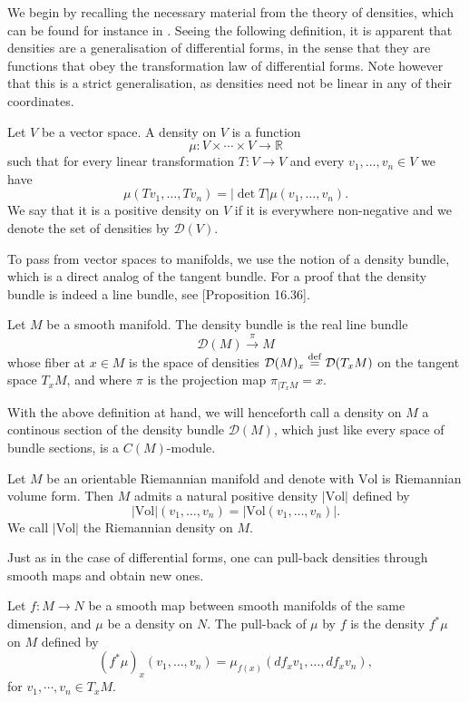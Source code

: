 \documentclass{report}
\begin{document}
We begin by recalling the necessary material from the theory of densities, which can be found for instance in \cite{lee2012smooth}. 
Seeing the following definition, it is apparent that densities are a generalisation of differential forms, in the sense that they are functions that obey the transformation law of differential forms.
Note however that this is a strict generalisation, as densities need not be linear in any of their coordinates. 
\begin{definition}
    Let $V$ be a vector space.
    A density on $V$ is a function
    \[
    \mu: V\times \cdots \times V \to \mathbb R
    \]
    such that for every linear transformation $T: V \to V$ and every $v_1, \ldots, v_n \in V$ we have
    \[ 
    \mu(Tv_1, \ldots, Tv_n) = |\det T| \mu(v_1, \ldots, v_n).
    \]
    We say that it is a positive density on $V$ if it is everywhere non-negative and we denote the set of densities by $\mathcal D(V)$.
\end{definition}
To pass from vector spaces to manifolds, we use the notion of a density bundle, which is a direct analog of the tangent bundle.
For a proof that the density bundle is indeed a line bundle, see \cite{lee2012smooth}[Proposition 16.36].
\begin{definition}
    Let $M$ be a smooth manifold.
    The density bundle is the real line bundle $$\mathcal D(M) \overset{\pi}{\to} M$$ whose fiber at $x \in M$ is the space of densities $\mathcal D(M)_x \overset{\mathrm{def}}{=} \mathcal D(T_x M)$ on the tangent space $T_x M$, and where $\pi$ is the projection map $\pi_{|T_x M} = x$.
\end{definition}
With the above definition at hand, we will henceforth call a density on $M$ a continous section of the density bundle $\mathcal D(M)$, which 
just like every space of bundle sections, is a $C(M)$-module.
\begin{example}
    Let $M$ be an orientable Riemannian manifold and denote with $\mathrm{Vol}$ is Riemannian volume form.
    Then $M$ admits a natural positive density $|\mathrm{Vol}|$ defined by
    \[
    |\mathrm{Vol}|(v_1, \ldots, v_n) = |\mathrm{Vol}(v_1, \ldots, v_n)|.
    \]
    We call $|\mathrm{Vol}|$ the Riemannian density on $M$.
\end{example}

Just as in the case of differential forms, one can pull-back densities through smooth maps and obtain new ones.
\begin{definition}
    Let $f: M \to N$ be a smooth map between smooth manifolds of the same dimension, and $\mu$ be a density on $N$.
    The pull-back of $\mu$ by $f$ is the density $f^*\mu$ on $M$ defined by
    \[
    (f^*\mu)_x(v_1, \ldots, v_n) = \mu_{f(x)}(df_x v_1, \ldots, df_x v_n),
    \]
    for $v_1, \cdots, v_n \in T_x M$.
\end{definition}
\end{document}
